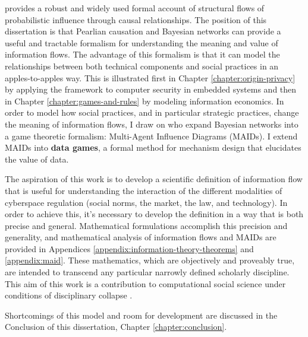 \documentclass[../thesis.tex]{subfiles}
\begin{document}
 \citet{pearl2009causality} provides a robust and widely used
 formal account of structural flows of probabilistic influence
 through causal relationships.
 The position of this dissertation is that Pearlian causation
 and Bayesian networks can provide a useful and tractable
 formalism for understanding the meaning and value of information
 flows.
 The advantage of this formalism is that it can model the
 relationships between both technical components and social
 practices in an apples-to-apples way.
 This is illustrated first in Chapter \ref{chapter:origin-privacy}
 by applying the framework to computer security in embedded systems
 and then in Chapter \ref{chapter:games-and-rules} by modeling
 information economics.
 In order to model how social practices, and in particular strategic
 practices, change the meaning of
 information flows, I draw on \citet{koller2003multi} who expand
 Bayesian networks into a game theoretic formalism: 
 Multi-Agent Influence Diagrams (MAIDs).
 I extend MAIDs into \textbf{data games}, a formal method
 for mechanism design that elucidates the value of data.

 The aspiration of this work is to develop a scientific definition
 of information flow that is useful for understanding the
 interaction of the different modalities of cyberspace regulation
 (social norms, the market, the law, and technology).
 In order to achieve this, it's necessary to develop the definition
 in a way that is both precise and general.
 Mathematical formulations accomplish this precision and generality,
 and mathematical analysis of information flows and MAIDs are
 provided in Appendices \ref{appendix:information-theory-theorems}
 and \ref{appendix:maid}.
 These mathematics, which are objectively and proveably true,
 are intended to transcend any particular
 narrowly defined scholarly discipline.
 This aim of this work is a contribution to computational social
 science \citep{benthall2016philosophy} under conditions of
 disciplinary collapse \citep{benthall2015designing}.

 Shortcomings of this model and room for development
 are discussed in the Conclusion of this
 dissertation, Chapter \ref{chapter:conclusion}.
 
 
\end{document}
